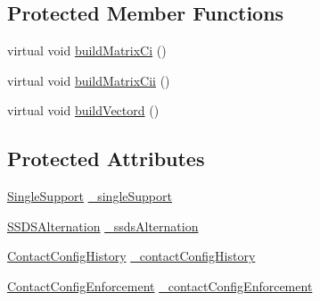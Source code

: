 \subsection*{\-Protected \-Member \-Functions}
\begin{DoxyCompactItemize}
\item 
virtual void \hyperlink{classAdmissibilityConstraints_a22333fbffb9df28433e066b5a00a9c00}{build\-Matrix\-Ci} ()
\item 
virtual void \hyperlink{classAdmissibilityConstraints_a98de6682160b1161d0eb57852ccfce25}{build\-Matrix\-Cii} ()
\item 
virtual void \hyperlink{classAdmissibilityConstraints_a48f89a09f8c9607925652622a8c70fb4}{build\-Vectord} ()
\end{DoxyCompactItemize}
\subsection*{\-Protected \-Attributes}
\begin{DoxyCompactItemize}
\item 
\hyperlink{classSingleSupport}{\-Single\-Support} \hyperlink{classAdmissibilityConstraints_aee4eb816d53a047667da3a7a1f1cac7a}{\-\_\-single\-Support}
\item 
\hyperlink{classSSDSAlternation}{\-S\-S\-D\-S\-Alternation} \hyperlink{classAdmissibilityConstraints_a250631ea82f9c5f88a785537f9e1e9a4}{\-\_\-ssds\-Alternation}
\item 
\hyperlink{classContactConfigHistory}{\-Contact\-Config\-History} \hyperlink{classAdmissibilityConstraints_af2e1d259480686b009077f0c20892bef}{\-\_\-contact\-Config\-History}
\item 
\hyperlink{classContactConfigEnforcement}{\-Contact\-Config\-Enforcement} \hyperlink{classAdmissibilityConstraints_af782db54a141b07c490f726187e2ca8e}{\-\_\-contact\-Config\-Enforcement}
\end{DoxyCompactItemize}


